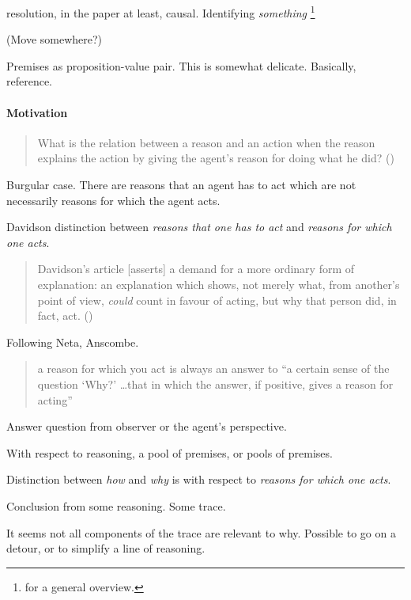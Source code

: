 \begin{note}
  \citeauthor{Davidson:1963aa} resolution, in the \citeyear{Davidson:1963aa} paper at least, causal.
  Identifying \emph{something}%
  \footnote{
    \textcite{Hieronymi:2011aa} for a general overview.
  }
\end{note}



\begin{note}
  \color{red}
  (Move somewhere?)

  Premises as proposition-value pair.
  This is somewhat delicate.
  Basically, reference.
\end{note}


\paragraph*{Motivation}

\begin{note}
  \begin{quote}
    What is the relation between a reason and an action when the reason explains the action by giving the agent's reason for doing what he did?%
    \mbox{}\hfill\mbox{({\citeyear[685]{Davidson:1963aa}})}
  \end{quote}

  Burgular case.
  There are reasons that an agent has to act which are not necessarily reasons for which the agent acts.

  Davidson distinction between \emph{reasons that one has to act} and \emph{reasons for which one acts}.

  \begin{quote}
    Davidson's article [asserts] a demand for a more ordinary form of explanation: an explanation which shows, not merely what, from another's point of view, \emph{could} count in favour of acting, but why that person did, in fact, act.%
    \mbox{}\hfill\mbox{(\citeyear[417]{Hieronymi:2011aa})}
  \end{quote}

  Following Neta, Anscombe.

  \begin{quote}
    a reason for which you act is always an answer to “a certain sense of the question ‘Why?' \dots that in which the answer, if positive, gives a reason for acting”
  \end{quote}

  Answer question from observer or the agent's perspective.

  With respect to reasoning, a pool of premises, or pools of premises.

  Distinction between \emph{how} and \emph{why} is with respect to \emph{reasons for which one acts}.

  Conclusion from some reasoning.
  Some trace.

  It seems not all components of the trace are relevant to why.
  Possible to go on a detour, or to simplify a line of reasoning.
\end{note}

